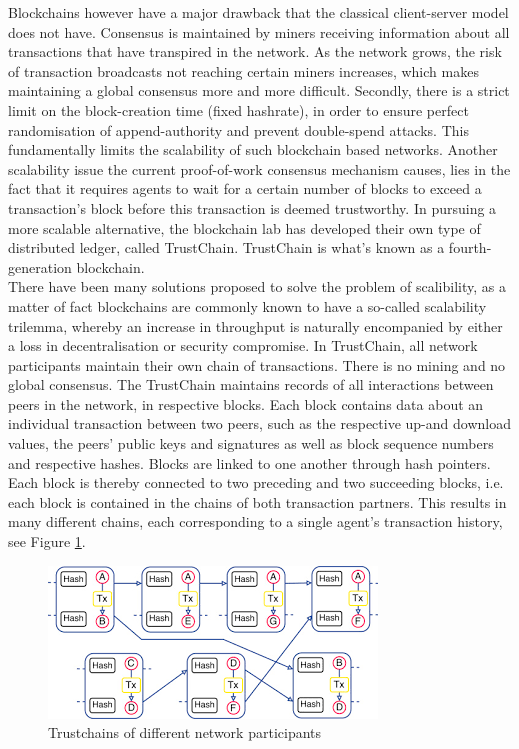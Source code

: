 \documentclass[11pt,a4paper]{article}
\theoremstyle{definition}
\theoremstyle{theorem}
\theoremstyle{proposition}
\theoremstyle{corollary}
\theoremstyle{lemma}
\theoremstyle{example}
\theoremstyle{remark}
\begin{document}
\noindent{}Blockchains however have a major drawback that the classical client-server model does not have. Consensus is maintained by miners receiving information about all transactions that have transpired in the network. As the network grows, the risk of transaction broadcasts not reaching certain miners increases, which makes maintaining a global consensus more and more difficult. Secondly, there is a strict limit on the block-creation time (fixed hashrate), in order to ensure perfect randomisation of append-authority and prevent double-spend attacks. This fundamentally limits the scalability of such blockchain based networks. Another scalability issue the current proof-of-work consensus mechanism causes, lies in the fact that it requires agents to wait for a certain number of blocks to exceed a transaction's block before this transaction is deemed trustworthy. In pursuing a more scalable alternative, the blockchain lab has developed their own type of distributed ledger, called TrustChain. TrustChain is what's known as a fourth-generation blockchain. \vspace{1em}\\

\noindent{}There have been many solutions proposed to solve the problem of scalibility, as a matter of fact blockchains are commonly known to have a so-called scalability trilemma, whereby an increase in throughput is naturally encompanied by either a loss in decentralisation or security compromise. In TrustChain, all network participants maintain their own chain of transactions. There is no mining and no global consensus. The TrustChain maintains records of all interactions between peers in the network, in respective blocks. Each block contains data about an individual transaction between two peers, such as the respective up-and download values, the peers' public keys and signatures as well as block sequence numbers and respective hashes. Blocks are linked to one another through hash pointers. Each block is thereby connected to two preceding and two succeeding blocks, i.e. each block is contained in the chains of both transaction partners. This results in many different chains, each corresponding to a single agent's transaction history, see Figure \ref{fig:Trustchain}\cite{TrustChain: A Sybil-resistant scalable blockchain}. \vspace{1em}\\

\begin{figure}[H]
\begin{center}
\includegraphics[scale=0.6]{Trustchain.png}
\caption{Trustchains of different network participants}
\label{fig:Trustchain}
\end{center}
\end{figure} 
\end{document}
